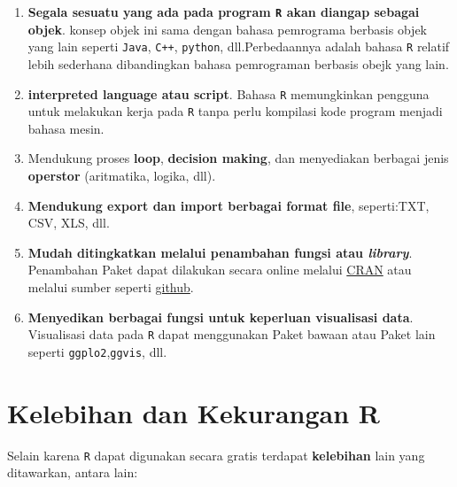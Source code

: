 \documentclass[
]{book}
\providecommand{\tightlist}{%
  \setlength{\itemsep}{0pt}\setlength{\parskip}{0pt}}
\theoremstyle{definition}
\theoremstyle{definition}
\theoremstyle{definition}
\theoremstyle{definition}
\theoremstyle{remark}
\begin{document}
\begin{enumerate}
\def\labelenumi{\arabic{enumi}.}
\setcounter{enumi}{1}
\tightlist
\item
  \textbf{Segala sesuatu yang ada pada program \texttt{R} akan diangap sebagai objek}. konsep objek ini sama dengan bahasa pemrograma berbasis objek yang lain seperti \texttt{Java}, \texttt{C++}, \texttt{python}, dll.Perbedaannya adalah bahasa \texttt{R} relatif lebih sederhana dibandingkan bahasa pemrograman berbasis obejk yang lain.
\item
  \textbf{interpreted language atau script}. Bahasa \texttt{R} memungkinkan pengguna untuk melakukan kerja pada \texttt{R} tanpa perlu kompilasi kode program menjadi bahasa mesin.
\item
  Mendukung proses \textbf{loop}, \textbf{decision making}, dan menyediakan berbagai jenis \textbf{operstor} (aritmatika, logika, dll).
\item
  \textbf{Mendukung export dan import berbagai format file}, seperti:TXT, CSV, XLS, dll.
\item
  \textbf{Mudah ditingkatkan melalui penambahan fungsi atau \emph{library}}. Penambahan Paket dapat dilakukan secara online melalui \href{https://cran.r-project.org/}{CRAN} atau melalui sumber seperti \href{https://github.com/}{github}.
\item
  \textbf{Menyedikan berbagai fungsi untuk keperluan visualisasi data}. Visualisasi data pada \texttt{R} dapat menggunakan Paket bawaan atau Paket lain seperti \texttt{ggplo2},\texttt{ggvis}, dll.
\end{enumerate}

\hypertarget{prosconsR}{%
\section{Kelebihan dan Kekurangan R}\label{prosconsR}}

Selain karena \texttt{R} dapat digunakan secara gratis terdapat \textbf{kelebihan} lain yang ditawarkan, antara lain:
\end{document}
